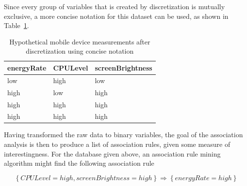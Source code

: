 Since every group of variables that is created by discretization is mutually exclusive, a more concise notation for this dataset can be used, as shown in Table~\ref{table:discreteDataConcise}.

\begin{table} %
    \begin{tabular}{ | l | l | l |}
    \hline
	\textbf{energyRate} & \textbf{CPULevel} & \textbf{screenBrightness} \\ \hline
    low & high & low  \\ \hline 
    high & low & high \\ \hline 
    high & high & high \\ \hline 
    high & high & high \\ \hline 
    \end{tabular}
    \caption{Hypothetical mobile device measurements after discretization using concise notation}
    \label{table:discreteDataConcise}
\end{table} 

 
 

Having transformed the raw data to binary variables, the goal of the association analysis is then to produce a list of association rules, given some measure of interestingness. For the database given above, an association rule mining algorithm might find the following association rule 

\[
	\left\{ CPULevel=high, screenBrightness=high \right\} \Rightarrow \left\{ energyRate=high \right\}
\]

